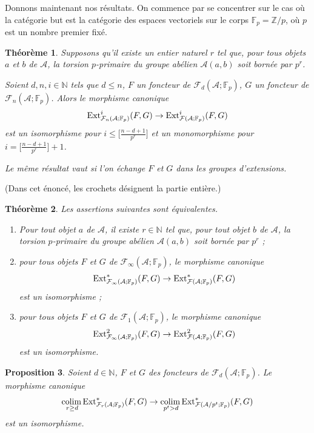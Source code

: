 \documentclass[a4paper,10pt]{article}
\newcommand{\A}{{\mathcal{A}}}
\newcommand{\F}{{\mathcal{F}}}
\newcommand{\col}{{\rm colim}\,}
\newtheorem{thm}{Th\'eor\`eme}[section]
\newtheorem{pr}[thm]{Proposition}
\theoremstyle{definition}
\theoremstyle{remark}
\begin{document}
\medskip

Donnons maintenant nos résultats. On commence par se concentrer sur le cas où la catégorie but est la catégorie des espaces vectoriels sur le corps $\mathbb{F}_p=\mathbb{Z}/p$, où $p$ est un nombre premier fixé.

\begin{thm}\label{th1}
 Supposons qu'il existe un entier naturel $r$ tel que, pour tous objets $a$ et $b$ de $\A$, la torsion $p$-primaire du groupe abélien $\A(a,b)$ soit bornée par $p^r$.

Soient $d,n,i\in\mathbb{N}$ tels que $d\leq n$, $F$ un foncteur de $\F_d(\A;\mathbb{F}_p)$, $G$ un foncteur de $\F_n(\A;\mathbb{F}_p)$. Alors le morphisme canonique
$${\rm Ext}^i_{\F_n(\A;\mathbb{F}_p)}(F,G)\to {\rm Ext}^i_{\F(\A;\mathbb{F}_p)}(F,G)$$
est un isomorphisme pour $i\leq \big[\frac{n-d+1}{p^r}\big]$ et un monomorphisme pour $i=\big[\frac{n-d+1}{p^r}\big]+1$.

Le même résultat vaut si l'on échange $F$ et $G$ dans les groupes d'extensions.
\end{thm}

(Dans cet énoncé, les crochets désignent la partie entière.)

\begin{thm}\label{th2}
 Les assertions suivantes sont équivalentes.
\begin{enumerate}
 \item Pour tout objet $a$ de $\A$, il existe $r\in\mathbb{N}$ tel que, pour tout objet $b$ de $\A$, la torsion $p$-primaire du groupe abélien $\A(a,b)$ soit bornée par $p^r$ ;
\item pour tous objets $F$ et $G$ de $\F_\infty(\A;\mathbb{F}_p)$, le morphisme canonique
$${\rm Ext}^*_{\F_\infty(\A;\mathbb{F}_p)}(F,G)\to {\rm Ext}^*_{\F(\A;\mathbb{F}_p)}(F,G)$$
est un isomorphisme ;
\item pour tous objets $F$ et $G$ de $\F_1(\A;\mathbb{F}_p)$, le morphisme canonique
$${\rm Ext}^2_{\F_\infty(\A;\mathbb{F}_p)}(F,G)\to {\rm Ext}^2_{\F(\A;\mathbb{F}_p)}(F,G)$$
est un isomorphisme.
\end{enumerate}
\end{thm}

\begin{pr}\label{pr3}
 Soient $d\in\mathbb{N}$, $F$ et $G$ des foncteurs de $\F_d(\A;\mathbb{F}_p)$. Le morphisme canonique
$$\underset{r\geq d}{\col} {\rm Ext}^*_{\F_r(\A;\mathbb{F}_p)}(F,G)\to \underset{p^t>d}{\col}{\rm Ext}^*_{\F(\A/p^t;\mathbb{F}_p)}(F,G)$$
est un isomorphisme.
\end{pr}
\end{document}
